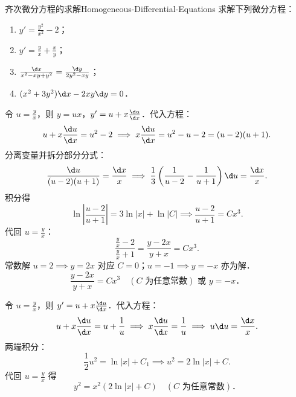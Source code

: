 \begin{problem}{齐次微分方程的求解}{Homogeneous-Differential-Equations}
    求解下列微分方程：
    \begin{enumerate}
        \item $y' = \frac{y^2}{x^2} - 2$；
        \item $y' = \frac{y}{x} + \frac{x}{y}$；
        \item $\frac{\d x}{x^2 - xy + y^2} = \frac{\d y}{2y^2 - xy}$；
        \item $(x^2 + 3y^2)\d x - 2xy \d y = 0$．
    \end{enumerate}
\end{problem}

\begin{solution}

    令 $u = \frac{y}{x}$，则 $y = ux$，$y' = u + x \frac{\d u}{\d x}$．代入方程：
    \begin{equation}
        u + x \frac{\d u}{\d x} = u^2 - 2 \implies x \frac{\d u}{\d x} = u^2 - u - 2 = (u - 2)(u + 1).
    \end{equation}
    分离变量并拆分部分分式：
    \begin{equation}
        \frac{\d u}{(u - 2)(u + 1)} = \frac{\d x}{x} \implies \frac{1}{3}\left( \frac{1}{u - 2} - \frac{1}{u + 1} \right)\d u = \frac{\d x}{x}.
    \end{equation}
    积分得
    \begin{equation}
        \ln\left| \frac{u - 2}{u + 1} \right| = 3\ln|x| + \ln|C| \implies \frac{u - 2}{u + 1} = C x^3.
    \end{equation}
    代回 $u = \frac{y}{x}$：
    \begin{equation}
        \frac{\frac{y}{x} - 2}{\frac{y}{x} + 1} = \frac{y - 2x}{y + x} = C x^3.
    \end{equation}
    常数解 $u = 2 \implies y = 2x$ 对应 $C = 0$；$u = -1 \implies y = -x$ 亦为解．
    \begin{equation}
        \boxed{\frac{y - 2x}{y + x} = C x^3 \quad (C \text{ 为任意常数}) \text{ 或 } y = -x．}
    \end{equation}


    令 $u = \frac{y}{x}$，则 $y' = u + x \frac{\d u}{\d x}$．代入方程：
    \begin{equation}
        u + x \frac{\d u}{\d x} = u + \frac{1}{u} \implies x \frac{\d u}{\d x} = \frac{1}{u} \implies u \d u = \frac{\d x}{x}.
    \end{equation}
    两端积分：
    \begin{equation}
        \frac{1}{2}u^2 = \ln|x| + C_1 \implies u^2 = 2\ln|x| + C.
    \end{equation}
    代回 $u = \frac{y}{x}$ 得
    \begin{equation}
        \boxed{y^2 = x^2 (2\ln|x| + C) \quad (C \text{ 为任意常数})．}
    \end{equation}


\end{solution}
